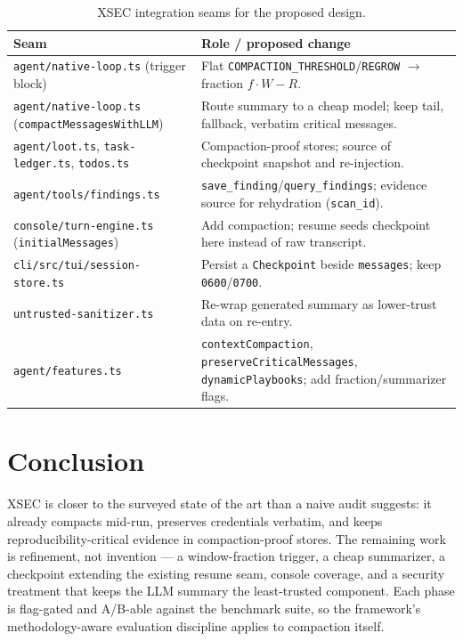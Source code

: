 \documentclass[11pt]{article}
\begin{document}
\begin{table}[t]
\centering
\small
\begin{tabular}{@{}p{4.6cm}p{8.4cm}@{}}
\toprule
\textbf{Seam} & \textbf{Role / proposed change} \\
\midrule
\texttt{agent/native-loop.ts} (trigger block) &
Flat \texttt{COMPACTION\_THRESHOLD}/\texttt{REGROW} $\to$ fraction $f\cdot W - R$. \\
\texttt{agent/native-loop.ts} \newline (\texttt{compactMessagesWithLLM}) &
Route summary to a cheap model; keep tail, fallback, verbatim critical messages. \\
\texttt{agent/loot.ts}, \texttt{task-ledger.ts}, \texttt{todos.ts} &
Compaction-proof stores; source of checkpoint snapshot and re-injection. \\
\texttt{agent/tools/findings.ts} &
\texttt{save\_finding}/\texttt{query\_findings}; evidence source for rehydration
(\texttt{scan\_id}). \\
\texttt{console/turn-engine.ts} (\texttt{initialMessages}) &
Add compaction; resume seeds checkpoint here instead of raw transcript. \\
\texttt{cli/src/tui/session-store.ts} &
Persist a \texttt{Checkpoint} beside \texttt{messages}; keep \texttt{0600}/\texttt{0700}. \\
\texttt{untrusted-sanitizer.ts} &
Re-wrap generated summary as lower-trust data on re-entry. \\
\texttt{agent/features.ts} &
\texttt{contextCompaction}, \texttt{preserveCriticalMessages}, \texttt{dynamicPlaybooks}; add fraction/summarizer flags. \\
\bottomrule
\end{tabular}
\caption{XSEC integration seams for the proposed design.}
\label{tab:seams}
\end{table}

\section{Conclusion}

XSEC is closer to the surveyed state of the art than a naive audit suggests: it
already compacts mid-run, preserves credentials verbatim, and keeps
reproducibility-critical evidence in compaction-proof stores. The remaining work
is refinement, not invention --- a window-fraction trigger, a cheap summarizer, a
checkpoint extending the existing resume seam, console coverage, and a security
treatment that keeps the LLM summary the least-trusted component. Each phase is
flag-gated and A/B-able against the benchmark suite, so the framework's
methodology-aware evaluation discipline applies to compaction itself.
\end{document}
